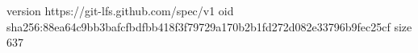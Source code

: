 version https://git-lfs.github.com/spec/v1
oid sha256:88ea64c9bb3bafcfbdfbb418f3f79729a170b2b1fd272d082e33796b9fec25cf
size 637
